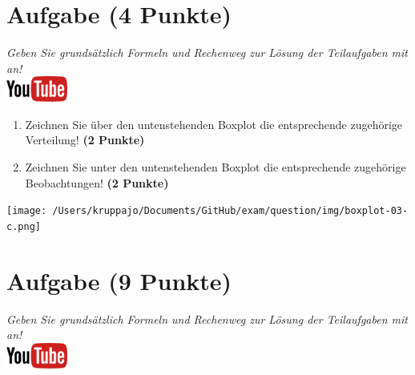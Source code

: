 \documentclass[a4paper, 10pt]{scrartcl}\usepackage[]{graphicx}\usepackage[]{xcolor}
\begin{document}
\section{Aufgabe \hfill (4 Punkte)}

\textit{Geben Sie grunds{\"a}tzlich Formeln und Rechenweg zur L{\"o}sung der
  Teilaufgaben mit an!} \\[1Ex]

\hfill\href{https://youtu.be/Op-gjzASH9I}{\includegraphics[width =
  2cm]{img/youtube}}\\[1Ex]



\begin{enumerate}
\item Zeichnen Sie {\"u}ber den untenstehenden Boxplot die entsprechende
  zugeh{\"o}rige Verteilung! \textbf{(2 Punkte)} 
\item Zeichnen Sie unter den untenstehenden Boxplot die entsprechende
  zugeh{\"o}rige Beobachtungen! \textbf{(2 Punkte)}
\end{enumerate}

\vspace*{8cm}

\begin{center}
  \texttt{[image: /Users/kruppajo/Documents/GitHub/exam/question/img/boxplot-03-c.png]}
\end{center}



 
\clearpage

\section{Aufgabe \hfill (9 Punkte)}

\textit{Geben Sie grunds{\"a}tzlich Formeln und Rechenweg zur L{\"o}sung der
  Teilaufgaben mit an!} \\[1Ex]

\hfill\href{https://youtu.be/lXI_H6m26HE}{\includegraphics[width =
  2cm]{img/youtube}}\\[1Ex]
\end{document}
